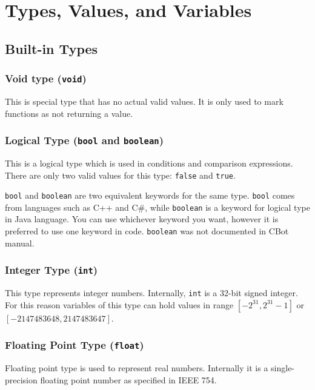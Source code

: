 
\chapter{Types, Values, and Variables}
\label{chap:cbot_types}


\section{Built-in Types}

\subsection{Void type (\texttt{void})}
This is special type that has no actual valid values. It is only used to mark functions as not returning a value.


\subsection{Logical Type (\texttt{bool} and \texttt{boolean})}
This is a logical type which is used in conditions and comparison expressions. There are only two valid values for this type: \texttt{false} and \texttt{true}.

\texttt{bool} and \texttt{boolean} are two equivalent keywords for the same type. \texttt{bool} comes from languages such as C++ and C\#, while \texttt{boolean} is a keyword for logical type in Java language. You can use whichever keyword you want, however it is preferred to use one keyword in code. \texttt{boolean} was not documented in CBot manual.


\subsection{Integer Type (\texttt{int})}
This type represents integer numbers. Internally, \texttt{int} is a 32-bit signed integer. For this reason variables of this type can hold values in range $[-2^{31}, 2^{31}-1]$ or $[-2 147 483 648, 2 147 483 647]$.


\subsection{Floating Point Type (\texttt{float})}
Floating point type is used to represent real numbers. Internally it is a single-precision floating point number as specified in IEEE 754.


